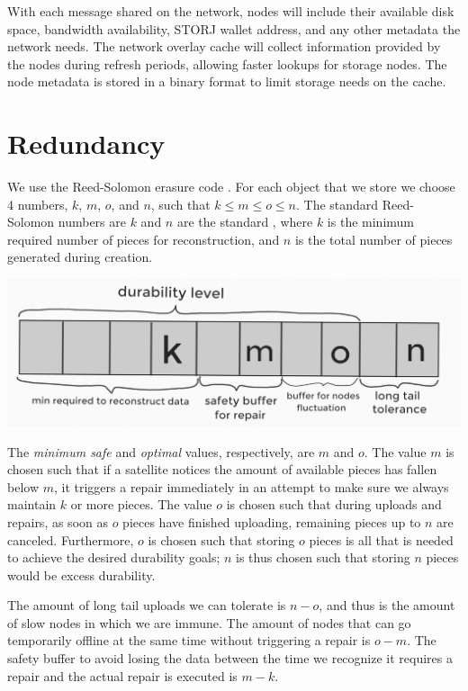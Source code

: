 \documentclass[11pt,fleqn,openany]{book}
\begin{document}
With each message shared on the network, nodes will include their available
disk space, bandwidth availability, STORJ wallet address, and any other
metadata the network needs.
The network overlay cache will collect information provided by the nodes
during refresh periods, allowing faster lookups for storage nodes.
The node metadata is stored in a binary format to limit storage
needs on the cache.

\section{Redundancy}

We use the Reed-Solomon erasure code \cite{rs}. For each object that we store
we choose 4 numbers, $k$, $m$, $o$, and $n$, such that $k\le m\le o\le n$.
The standard Reed-Solomon numbers are $k$ and $n$ are the standard , where $k$ is the minimum
required number of pieces for reconstruction, and $n$ is the total number of
pieces generated during creation.

\begin{center}
\includegraphics[width=\textwidth]{diagram-drafts/redundancy_kmon.png}
\end{center}

The {\em minimum safe} and {\em optimal} values, respectively, are $m$ and $o$. The 
value $m$ is chosen such that if a satellite notices the amount of available pieces
has fallen below $m$, it triggers a repair
immediately in an attempt to make sure we always maintain
$k$ or more pieces. The value $o$ is chosen such that during uploads and repairs,
as soon as $o$ pieces have finished uploading, remaining pieces up to $n$ are
canceled.
Furthermore, $o$ is chosen such that storing $o$ pieces is all that is
needed to achieve the desired durability goals; $n$ is thus chosen such that
storing $n$ pieces would be excess durability.

The amount of long tail uploads we can tolerate is $n-o$, and thus is the amount
of slow nodes in which we are immune.  The amount of nodes that can go
temporarily offline at the same time without triggering a repair is $o-m$. The
safety buffer to avoid losing the data between the time we recognize it requires
a repair and the actual repair is executed is $m-k$.
\end{document}
